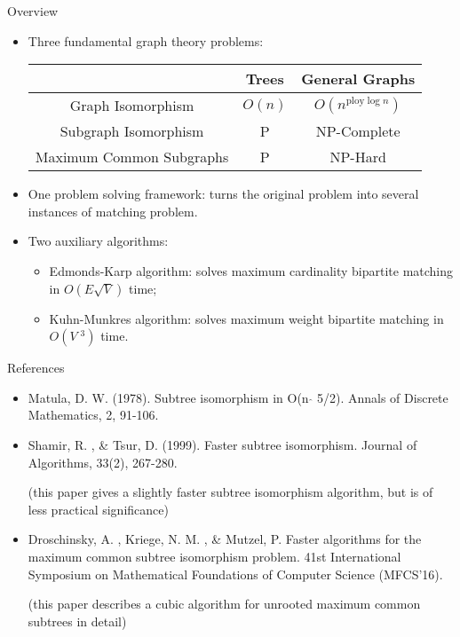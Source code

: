 \documentclass[handout]{beamer}
\begin{document}
\begin{frame}{Overview}

\begin{itemize}
\item Three fundamental graph theory problems:
\begin{table}
	\centering
	\begin{tabular}{|c|c|c|}
		\hline 
		& Trees & General Graphs \\ 
		\hline 
		Graph Isomorphism & $O(n)$ & $O(n^{\text{ploy}\log n})$ \\ 
		\hline 
		Subgraph Isomorphism & P & NP-Complete \\ 
		\hline 
		Maximum Common Subgraphs & P & NP-Hard \\
		\hline 
	\end{tabular} 
\end{table}
\item One problem solving framework: turns the original problem into several instances of matching problem.
\item Two auxiliary algorithms:
\begin{itemize}
	\item Edmonds-Karp algorithm: solves maximum cardinality bipartite matching in $O(E\sqrt{V})$ time;
	\item Kuhn-Munkres algorithm: solves maximum weight bipartite matching in $O(V\;^3)$ time.
\end{itemize}
\end{itemize}
\end{frame}

\begin{frame}{References}
\begin{itemize}
\item Matula, D. W. (1978). Subtree isomorphism in O(n $\hat{}$ 5/2). Annals of Discrete Mathematics, 2, 91-106.

\item Shamir, R. , \& Tsur, D. (1999). Faster subtree isomorphism. Journal of Algorithms, 33(2), 267-280.

(this paper gives a slightly faster subtree isomorphism algorithm, but is of less practical significance)

\item Droschinsky, A. , Kriege, N. M. , \& Mutzel, P. Faster algorithms for the maximum common subtree isomorphism problem. 41st International Symposium on Mathematical Foundations of Computer Science (MFCS'16).

(this paper describes a cubic algorithm for unrooted maximum common subtrees in detail)
\end{itemize}
\end{frame}
\end{document}
